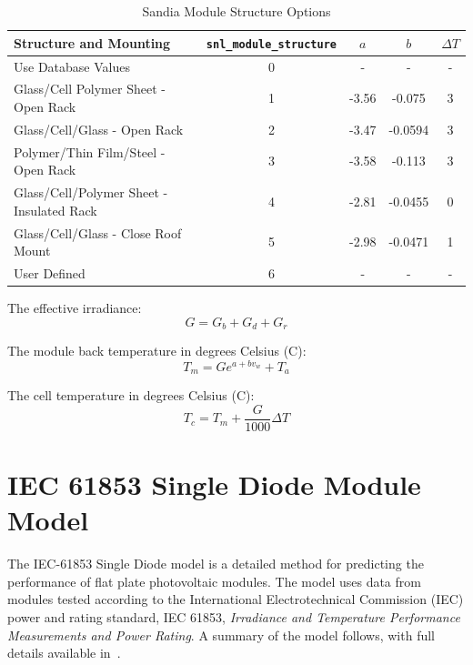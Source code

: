 \documentclass[12pt,letterpaper]{article}
\begin{document}
\begin{table}
\begin{center}
\caption{Sandia Module Structure Options}
\begin{tabular}{lcccc}
\midrule
Structure and Mounting & \texttt{snl\_module\_structure} & $a$ & $b$ & $\Delta T$ \\
\midrule
Use Database Values & 0 & - & - & - \\
Glass/Cell Polymer Sheet - Open Rack & 1 & -3.56 & -0.075 & 3 \\
Glass/Cell/Glass - Open Rack & 2 & -3.47 & -0.0594 & 3 \\
Polymer/Thin Film/Steel - Open Rack & 3 & -3.58 & -0.113 & 3 \\
Glass/Cell/Polymer Sheet - Insulated Rack & 4 & -2.81 & -0.0455 & 0 \\
Glass/Cell/Glass - Close Roof Mount & 5 & -2.98 & -0.0471 & 1 \\
User Defined & 6 & - & - & - \\
\hline
\end{tabular}
\label{tab-sandiamodstruct}
\end{center}
\end{table}

The effective irradiance:
\begin{equation}
G = G_b + G_d + G_r
\end{equation}

The module back temperature in degrees Celsius (\degree C):
\begin{equation}
T_m = G e^{a+b v_w} + T_a
\end{equation}

The cell temperature in degrees Celsius (\degree C):
\begin{equation}\label{eqn-sandiatemp}
T_c = T_m + \frac{G}{1000}  \Delta T
\end{equation}

\section{IEC 61853 Single Diode Module Model}\label{sec-iecmodule}

The IEC-61853 Single Diode model is a detailed method for predicting the performance of flat plate photovoltaic modules.  The model uses data from modules tested according to the International Electrotechnical Commission (IEC) power and rating standard, IEC 61853, \textit{Irradiance and Temperature Performance Measurements and Power Rating}.  A summary of the model follows, with full details available in~\cite{dobos2014}.
\end{document}
